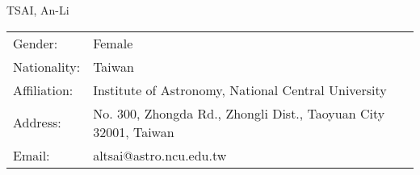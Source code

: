 \documentclass[a4paper, 11pt]{article}
\def\name{TSAI, An-Li}
\begin{document}
{\huge \name}


\vspace{0.25in}

\begin{minipage}{0.45\linewidth}
\end{minipage}
\begin{minipage}{0.45\linewidth}
  \begin{tabular}{ll}
    Gender: & Female \\
    Nationality: & Taiwan \\
    Affiliation: & Institute of Astronomy, National Central University \\
    Address: & No. 300, Zhongda Rd., Zhongli Dist., Taoyuan City 32001, Taiwan  \\
    Email: & altsai@astro.ncu.edu.tw \\
  \end{tabular}
\end{minipage}
\end{document}

